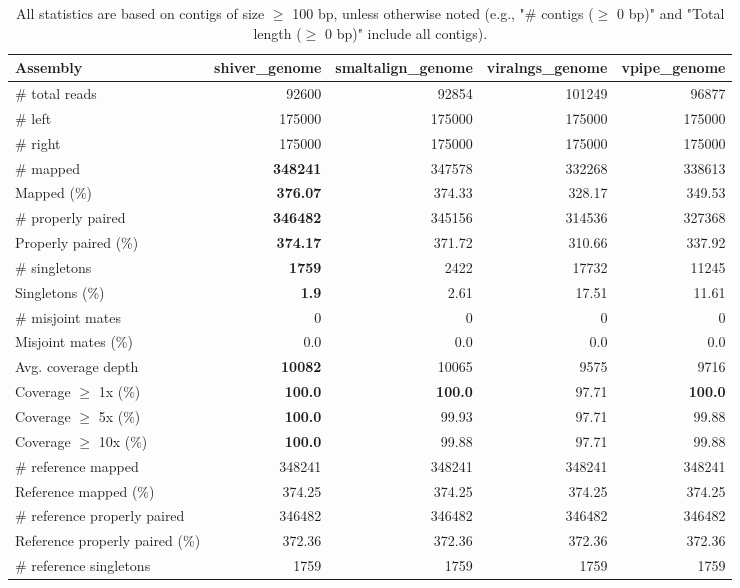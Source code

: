 \documentclass[12pt,a4paper]{article}
\begin{document}
\begin{table}[ht]
\begin{center}
\caption{All statistics are based on contigs of size $\geq$ 100 bp, unless otherwise noted (e.g., "\# contigs ($\geq$ 0 bp)" and "Total length ($\geq$ 0 bp)" include all contigs).}
\begin{tabular}{|l*{4}{|r}|}
\hline
Assembly & shiver\_genome & smaltalign\_genome & viralngs\_genome & vpipe\_genome \\ \hline
\# total reads & 92600 & 92854 & 101249 & 96877 \\ \hline
\# left & 175000 & 175000 & 175000 & 175000 \\ \hline
\# right & 175000 & 175000 & 175000 & 175000 \\ \hline
\# mapped & {\bf 348241} & 347578 & 332268 & 338613 \\ \hline
Mapped (\%) & {\bf 376.07} & 374.33 & 328.17 & 349.53 \\ \hline
\# properly paired & {\bf 346482} & 345156 & 314536 & 327368 \\ \hline
Properly paired (\%) & {\bf 374.17} & 371.72 & 310.66 & 337.92 \\ \hline
\# singletons & {\bf 1759} & 2422 & 17732 & 11245 \\ \hline
Singletons (\%) & {\bf 1.9} & 2.61 & 17.51 & 11.61 \\ \hline
\# misjoint mates & 0 & 0 & 0 & 0 \\ \hline
Misjoint mates (\%) & 0.0 & 0.0 & 0.0 & 0.0 \\ \hline
Avg. coverage depth & {\bf 10082} & 10065 & 9575 & 9716 \\ \hline
Coverage $\geq$ 1x (\%) & {\bf 100.0} & {\bf 100.0} & 97.71 & {\bf 100.0} \\ \hline
Coverage $\geq$ 5x (\%) & {\bf 100.0} & 99.93 & 97.71 & 99.88 \\ \hline
Coverage $\geq$ 10x (\%) & {\bf 100.0} & 99.88 & 97.71 & 99.88 \\ \hline
\# reference mapped & 348241 & 348241 & 348241 & 348241 \\ \hline
Reference mapped (\%) & 374.25 & 374.25 & 374.25 & 374.25 \\ \hline
\# reference properly paired & 346482 & 346482 & 346482 & 346482 \\ \hline
Reference properly paired (\%) & 372.36 & 372.36 & 372.36 & 372.36 \\ \hline
\# reference singletons & 1759 & 1759 & 1759 & 1759 \\ \hline

\end{tabular}
\end{center}
\end{table}
\end{document}
